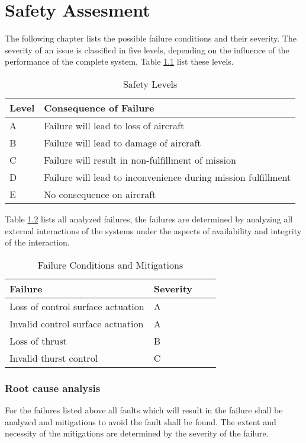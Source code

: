 \chapter{Safety Assesment}
The following chapter lists the possible failure conditions
and their severity. The severity of an issue is classified in 
five levels, depending on the influence of the performance
of the complete system, Table \ref{tab:03:severityLevels}
list these levels.

\begin{table}[H]
    \centering
    \begin{tabular}{ll}
        \toprule 
        Level & Consequence of Failure \\
        \midrule
        A & Failure will lead to loss of aircraft \\
        B & Failure will lead to damage of aircraft \\
        C & Failure will result in non-fulfillment of mission \\ 
        D & Failure will lead to inconvenience during mission fulfillment \\
        E & No consequence on aircraft \\
        \bottomrule
    \end{tabular}
    \caption{Safety Levels}
    \label{tab:03:severityLevels}
\end{table}

Table \ref{tab:03:failure} lists all analyzed failures,
the failures are determined by analyzing all external interactions
of the systems under the aspects of availability and integrity of 
the interaction.

\begin{table}[H]
    \centering
    \begin{tabular}{l|l|l|p{5.6cm}}
        \toprule
        Failure & Severity & \\
        \midrule
        Loss of control surface actuation & A & \\
        Invalid control surface actuation & A & \\
        Loss of thrust & B & \\
        Invalid thurst control & C & \\
        \bottomrule
    \end{tabular}
    \caption{Failure Conditions and Mitigations}
    \label{tab:03:failure}
\end{table}

\subsection{Root cause analysis}
For the failures listed above all faults which will result in the failure
shall be analyzed and mitigations to avoid the fault shall be found. 
The extent and necessity of the mitigations are determined by the severity of the failure.